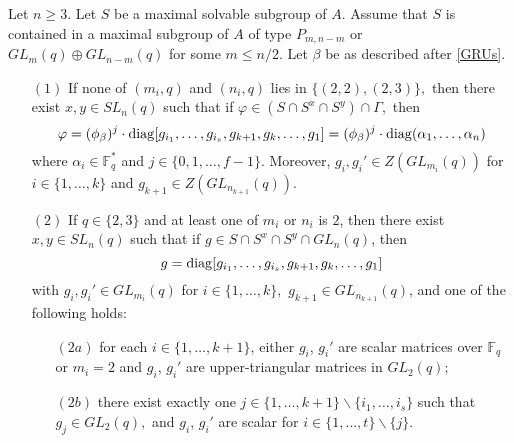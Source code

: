 \begin{Lem}
\label{GRdiag}
Let $n \ge 3$. Let  $S$ be a maximal solvable subgroup of $A$. Assume that $S$ is contained in a maximal subgroup of $A$ of type $P_{m,n-m}$ or $GL_m(q) \oplus GL_{n-m}(q)$ for some $m \le n/2.$ Let $\beta$ be as described after \eqref{GRUs}.
\begin{enumerate}
\item[$(1)$] If none of $(m_i, q)$ and $(n_i,q)$ lies in $\{(2,2), (2,3)\},$ then there exist $x, y \in SL_n(q)$ such that if $\varphi \in (S \cap S^x \cap S^y) \cap \Gamma,$ then 
\begin{equation}
\label{GRvarphdiagc1}
\varphi=(\phi_{\beta})^j \cdot \mathrm{diag}[g_{i_1}, \ldots,g_{i_s}, g_{k+1}, g_k, \ldots,  g_1]=(\phi_{\beta})^j \cdot \mathrm{diag}(\alpha_1, \ldots, \alpha_n)
\end{equation}
 where $\alpha_i \in \mathbb{F}_q^*$ and $j \in \{0,1, \ldots, f-1\}.$ Moreover, $g_i, g_i' \in Z(GL_{m_i}(q))$ for $i \in \{1, \ldots, k\}$ and $g_{k+1} \in Z(GL_{n_{k+1}}(q))$.
\item[$(2)$] If $q \in \{2,3\}$ and at least one of $m_i$ or $n_i$ is $2$, then there exist $x,y \in SL_n(q)$ such that if $g \in S \cap S^x \cap S^y \cap GL_n(q)$, then $$g=\mathrm{diag}[g_{i_1}, \ldots,g_{i_s}, g_{k+1}, g_k, \ldots,  g_1]$$ with $g_i, g_i' \in GL_{m_i}(q)$ for $i \in \{1, \ldots, k\},$ $g_{k+1} \in GL_{n_{k+1}}(q)$, and one of the following holds:
\begin{enumerate} 
\item[$(2a)$]  for each $i \in \{1, \ldots, k+1\}$, either  $g_i$, $g_i'$ are  scalar matrices over $\mathbb{F}_q$ or $m_i=2$ and  $g_i$, $g_i'$ are upper-triangular matrices in $GL_2(q);$
\item[$(2b)$] there exist exactly one $j \in \{1, \ldots, k+1\} \backslash \{i_1, \ldots, i_s\}$ such that $g_j \in GL_2(q),$ and $g_i$, $g_i'$ are scalar for $i \in \{1, \ldots, t\} \backslash \{j\}.$
\end{enumerate}
\end{enumerate}
\end{Lem}
